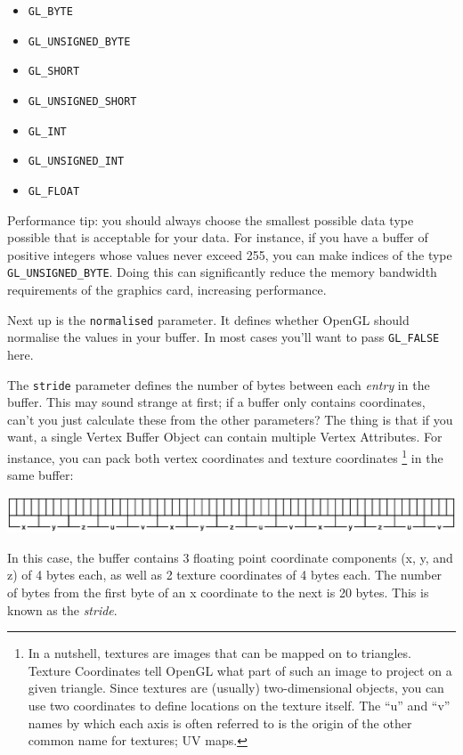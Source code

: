 \begin{itemize}
	\item \texttt{GL_BYTE}
	\item \texttt{GL_UNSIGNED_BYTE}
	\item \texttt{GL_SHORT}
	\item \texttt{GL_UNSIGNED_SHORT}
	\item \texttt{GL_INT}
	\item \texttt{GL_UNSIGNED_INT}
	\item \texttt{GL_FLOAT}
\end{itemize}

Performance tip: you should always choose the smallest possible data type possible that is acceptable for your data. For instance, if you have a buffer of positive integers whose values never exceed 255, you can make indices of the type \texttt{GL_UNSIGNED_BYTE}. Doing this can significantly reduce the memory bandwidth requirements of the graphics card, increasing performance.

Next up is the \texttt{normalised} parameter. It defines whether OpenGL should normalise the values in your buffer. In most cases you'll want to pass \texttt{GL_FALSE} here. 

The \texttt{stride} parameter defines the number of bytes between each \emph{entry} in the buffer. This may sound strange at first; if a buffer only contains coordinates, can't you just calculate these from the other parameters? The thing is that if you want, a single Vertex Buffer Object can contain multiple Vertex Attributes. For instance, you can pack both vertex coordinates and texture coordinates \footnote{In a nutshell, textures are images that can be mapped on to triangles. Texture Coordinates tell OpenGL what part of such an image to project on a given triangle. Since textures are (usually) two-dimensional objects, you can use two coordinates to define locations on the texture itself. The ``u'' and ``v'' names by which each axis is often referred to is the origin of the other common name for textures; UV maps.} in the same buffer:

\centerline{\includegraphics[scale=0.6]{images/openGL_interleaved_buffer.eps}}

In this case, the buffer contains 3 floating point coordinate components (x, y, and z) of 4 bytes each, as well as 2 texture coordinates of 4 bytes each. The number of bytes from the first byte of an x coordinate to the next is 20 bytes. This is known as the \emph{stride}. 

